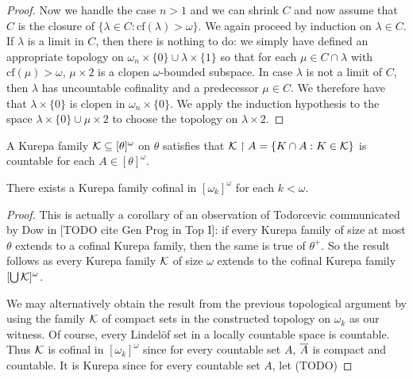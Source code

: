 \documentclass[11pt]{article}
\begin{document}
\begin{proof}
                Now we handle the case $n>1$ and we can shrink $C$
                and now assume
                that $C$ is the closure of $\{\lambda\in C : \mbox{cf}(\lambda)>\omega\}$.
                We again proceed by induction on $\lambda\in C$.  If
                $\lambda$ is a limit in $C$, then there is nothing to do: we
                simply have defined an appropriate topology on
                $\omega_n\times  \{0\}\cup \lambda\times \{1\}$ so that
                for each $\mu\in C\cap \lambda$ with $\mbox{cf}(\mu)>\omega$,
                 $\mu\times 2$ is a clopen $\omega$-bounded subspace.
                In case $\lambda$ is not a limit of $C$, then $\lambda$
                has uncountable cofinality and a predecessor $\mu\in C$.
                We therefore have that $\lambda\times\{0\}$ is clopen
                in $\omega_n\times \{0\}$.
                 We apply the induction hypothesis
                to the space $\lambda\times \{0\} \cup \mu\times 2$ to choose
                the topology on $\lambda\times 2$.


            \end{proof}

  \begin{definition}
    A Kurepa family \(\mathcal{K}\subseteq[\theta]^{\omega}\) on \(\theta\)
    satisfies that
    \(\mathcal{K}\restriction A=\{K\cap A:K\in\mathcal{K}\}\) is countable
    for each \(A\in[\theta]^\omega\).
  \end{definition}

  \begin{corollary}
    There exists a Kurepa family cofinal in \([\omega_k]^\omega\)
    for each \(k<\omega\).
  \end{corollary}

  \begin{proof}
    This is actually a corollary of an observation of Todorcevic communicated
    by Dow in [TODO cite Gen Prog in Top I]:
    if every Kurepa family of size at most \(\theta\)
    extends to a cofinal Kurepa family, then the same is true of \(\theta^+\).
    So the result follows as
    every Kurepa family \(\mathcal{K}\) of size \(\omega\) extends to
    the cofinal Kurepa family \([\bigcup\mathcal{K}]^\omega\).

    We may alternatively
    obtain the result from the previous topological argument by using the family
    \(\mathcal{K}\) of compact sets in the constructed topology on
    \(\omega_k\) as our witness. Of course, every Lindel\"of set in
    a locally countable space is countable. Thus \(\mathcal{K}\)
    is cofinal in \([\omega_k]^\omega\)
    since for every countable set \(A\), \(\overline{A}\) is compact and countable.
    It is Kurepa since for every countable set \(A\), let (TODO)
  \end{proof}
\end{document}
